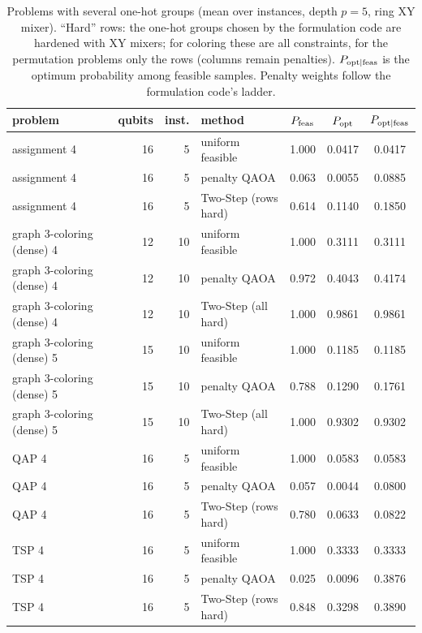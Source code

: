 \begin{table}[t]\centering\small
\caption{Problems with several one-hot groups (mean over instances, depth $p=5$, ring XY mixer). ``Hard'' rows: the one-hot groups chosen by the formulation code are hardened with XY mixers; for coloring these are all constraints, for the permutation problems only the rows (columns remain penalties). $P_{\rm opt|feas}$ is the optimum probability among feasible samples. Penalty weights follow the formulation code's ladder.}
\label{tab:multi}
\begin{tabular}{lrrlccc}\toprule
problem & qubits & inst. & method & $P_{\rm feas}$ & $P_{\rm opt}$ & $P_{\rm opt|feas}$\\\midrule
assignment 4 & 16 & 5 & uniform feasible & 1.000 & 0.0417 & 0.0417\\
assignment 4 & 16 & 5 & penalty QAOA & 0.063 & 0.0055 & 0.0885\\
assignment 4 & 16 & 5 & Two-Step (rows hard) & 0.614 & 0.1140 & 0.1850\\
\midrule
graph 3-coloring (dense) 4 & 12 & 10 & uniform feasible & 1.000 & 0.3111 & 0.3111\\
graph 3-coloring (dense) 4 & 12 & 10 & penalty QAOA & 0.972 & 0.4043 & 0.4174\\
graph 3-coloring (dense) 4 & 12 & 10 & Two-Step (all hard) & 1.000 & 0.9861 & 0.9861\\
\midrule
graph 3-coloring (dense) 5 & 15 & 10 & uniform feasible & 1.000 & 0.1185 & 0.1185\\
graph 3-coloring (dense) 5 & 15 & 10 & penalty QAOA & 0.788 & 0.1290 & 0.1761\\
graph 3-coloring (dense) 5 & 15 & 10 & Two-Step (all hard) & 1.000 & 0.9302 & 0.9302\\
\midrule
QAP 4 & 16 & 5 & uniform feasible & 1.000 & 0.0583 & 0.0583\\
QAP 4 & 16 & 5 & penalty QAOA & 0.057 & 0.0044 & 0.0800\\
QAP 4 & 16 & 5 & Two-Step (rows hard) & 0.780 & 0.0633 & 0.0822\\
\midrule
TSP 4 & 16 & 5 & uniform feasible & 1.000 & 0.3333 & 0.3333\\
TSP 4 & 16 & 5 & penalty QAOA & 0.025 & 0.0096 & 0.3876\\
TSP 4 & 16 & 5 & Two-Step (rows hard) & 0.848 & 0.3298 & 0.3890\\
\bottomrule\end{tabular}\end{table}
